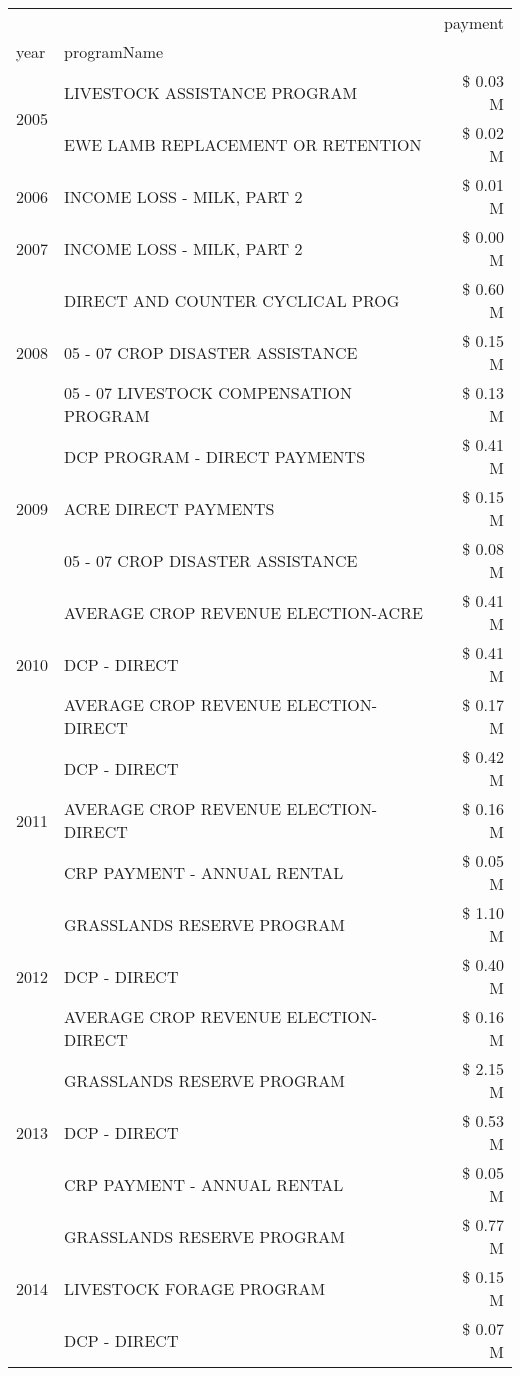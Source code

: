 \begin{tabular}{llr}
\toprule
 &  & payment \\
year & programName &  \\
\midrule
\multirow[t]{2}{*}{2005} & LIVESTOCK ASSISTANCE PROGRAM & \$ 0.03 M \\
 & EWE LAMB REPLACEMENT OR RETENTION & \$ 0.02 M \\
\cline{1-3}
2006 & INCOME LOSS - MILK, PART 2 & \$ 0.01 M \\
\cline{1-3}
2007 & INCOME LOSS - MILK, PART 2 & \$ 0.00 M \\
\cline{1-3}
\multirow[t]{3}{*}{2008} & DIRECT AND COUNTER CYCLICAL PROG & \$ 0.60 M \\
 & 05 - 07 CROP DISASTER ASSISTANCE & \$ 0.15 M \\
 & 05 - 07 LIVESTOCK COMPENSATION PROGRAM & \$ 0.13 M \\
\cline{1-3}
\multirow[t]{3}{*}{2009} & DCP PROGRAM - DIRECT PAYMENTS & \$ 0.41 M \\
 & ACRE DIRECT PAYMENTS & \$ 0.15 M \\
 & 05 - 07 CROP DISASTER ASSISTANCE & \$ 0.08 M \\
\cline{1-3}
\multirow[t]{3}{*}{2010} & AVERAGE CROP REVENUE ELECTION-ACRE & \$ 0.41 M \\
 & DCP - DIRECT & \$ 0.41 M \\
 & AVERAGE CROP REVENUE ELECTION-DIRECT & \$ 0.17 M \\
\cline{1-3}
\multirow[t]{3}{*}{2011} & DCP - DIRECT & \$ 0.42 M \\
 & AVERAGE CROP REVENUE ELECTION-DIRECT & \$ 0.16 M \\
 & CRP PAYMENT - ANNUAL RENTAL & \$ 0.05 M \\
\cline{1-3}
\multirow[t]{3}{*}{2012} & GRASSLANDS RESERVE PROGRAM & \$ 1.10 M \\
 & DCP - DIRECT & \$ 0.40 M \\
 & AVERAGE CROP REVENUE ELECTION-DIRECT & \$ 0.16 M \\
\cline{1-3}
\multirow[t]{3}{*}{2013} & GRASSLANDS RESERVE PROGRAM & \$ 2.15 M \\
 & DCP - DIRECT & \$ 0.53 M \\
 & CRP PAYMENT - ANNUAL RENTAL & \$ 0.05 M \\
\cline{1-3}
\multirow[t]{3}{*}{2014} & GRASSLANDS RESERVE PROGRAM & \$ 0.77 M \\
 & LIVESTOCK FORAGE PROGRAM & \$ 0.15 M \\
 & DCP - DIRECT & \$ 0.07 M \\

\end{tabular}
